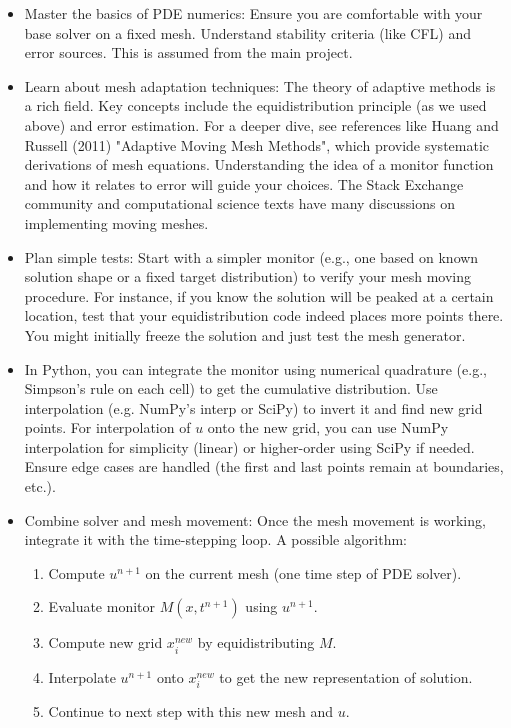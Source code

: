 \documentclass{adonis}
\begin{document}
\begin{itemize}
    \item Master the basics of PDE numerics: Ensure you are comfortable with your base solver on a fixed mesh. Understand stability criteria (like CFL) and error sources. This is assumed from the main project.
    \item Learn about mesh adaptation techniques: The theory of adaptive methods is a rich field. Key concepts include the equidistribution principle (as we used above) and error estimation. For a deeper dive, see references like Huang and Russell (2011) "Adaptive Moving Mesh Methods", which provide systematic derivations of mesh equations. Understanding the idea of a monitor function and how it relates to error will guide your choices. The Stack Exchange community and computational science texts have many discussions on implementing moving meshes.
    \item Plan simple tests: Start with a simpler monitor (e.g., one based on known solution shape or a fixed target distribution) to verify your mesh moving procedure. For instance, if you know the solution will be peaked at a certain location, test that your equidistribution code indeed places more points there. You might initially freeze the solution and just test the mesh generator.
    \item  In Python, you can integrate the monitor using numerical quadrature (e.g., Simpson’s rule on each cell) to get the cumulative distribution. Use interpolation (e.g. NumPy's interp or SciPy) to invert it and find new grid points. For interpolation of $u$ onto the new grid, you can use NumPy interpolation for simplicity (linear) or higher-order using SciPy if needed. Ensure edge cases are handled (the first and last points remain at boundaries, etc.).
    \item Combine solver and mesh movement: Once the mesh movement is working, integrate it with the time-stepping loop. A possible algorithm:
    \begin{enumerate}
        \item  Compute $u^{n+1}$ on the current mesh (one time step of PDE solver). 
        \item Evaluate monitor $M(x,t^{n+1})$ using $u^{n+1}$. 
        \item Compute new grid ${x_i^{new}}$ by equidistributing $M$.
        \item Interpolate $u^{n+1}$ onto ${x_i^{new}}$ to get the new representation of solution.
        \item Continue to next step with this new mesh and $u$.
    \end{enumerate} 
\end{itemize}
\end{document}
